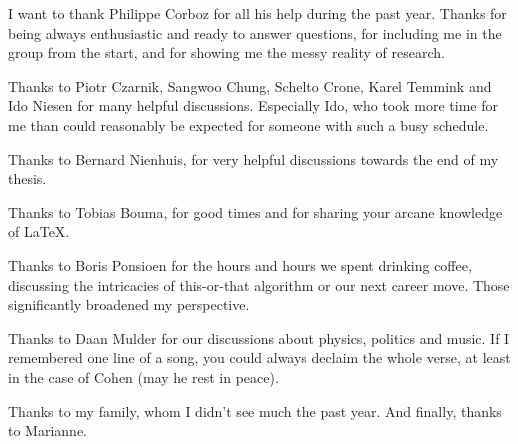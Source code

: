 I want to thank Philippe Corboz for all his help during the past year.
Thanks for being always enthusiastic and ready to answer questions, for including me in the group from the start,
and for showing me the messy reality of research.

Thanks to Piotr Czarnik, Sangwoo Chung, Schelto Crone, Karel Temmink and Ido Niesen for many helpful discussions.
Especially Ido, who took more time for me than could reasonably be expected for someone with such a busy schedule.

Thanks to Bernard Nienhuis, for very helpful discussions towards the end of my thesis.

Thanks to Tobias Bouma, for good times and for sharing your arcane knowledge of LaTeX.

Thanks to Boris Ponsioen for the hours and hours we spent drinking coffee,
discussing the intricacies of this-or-that algorithm or our next career move.
Those significantly broadened my perspective.

Thanks to Daan Mulder for our discussions about physics, politics and music.
If I remembered one line of a song, you could always declaim the whole verse,
at least in the case of Cohen (may he rest in peace).

Thanks to my family, whom I didn't see much the past year. And finally, thanks to Marianne.

